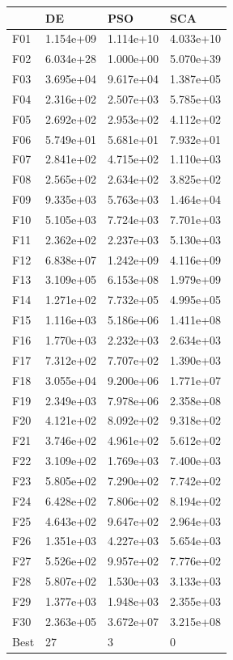 \begin{tabular}{llll}
\toprule
{} &         DE &        PSO &        SCA \\
\midrule
F01  &  1.154e+09 &  1.114e+10 &  4.033e+10 \\
F02  &  6.034e+28 &  1.000e+00 &  5.070e+39 \\
F03  &  3.695e+04 &  9.617e+04 &  1.387e+05 \\
F04  &  2.316e+02 &  2.507e+03 &  5.785e+03 \\
F05  &  2.692e+02 &  2.953e+02 &  4.112e+02 \\
F06  &  5.749e+01 &  5.681e+01 &  7.932e+01 \\
F07  &  2.841e+02 &  4.715e+02 &  1.110e+03 \\
F08  &  2.565e+02 &  2.634e+02 &  3.825e+02 \\
F09  &  9.335e+03 &  5.763e+03 &  1.464e+04 \\
F10  &  5.105e+03 &  7.724e+03 &  7.701e+03 \\
F11  &  2.362e+02 &  2.237e+03 &  5.130e+03 \\
F12  &  6.838e+07 &  1.242e+09 &  4.116e+09 \\
F13  &  3.109e+05 &  6.153e+08 &  1.979e+09 \\
F14  &  1.271e+02 &  7.732e+05 &  4.995e+05 \\
F15  &  1.116e+03 &  5.186e+06 &  1.411e+08 \\
F16  &  1.770e+03 &  2.232e+03 &  2.634e+03 \\
F17  &  7.312e+02 &  7.707e+02 &  1.390e+03 \\
F18  &  3.055e+04 &  9.200e+06 &  1.771e+07 \\
F19  &  2.349e+03 &  7.978e+06 &  2.358e+08 \\
F20  &  4.121e+02 &  8.092e+02 &  9.318e+02 \\
F21  &  3.746e+02 &  4.961e+02 &  5.612e+02 \\
F22  &  3.109e+02 &  1.769e+03 &  7.400e+03 \\
F23  &  5.805e+02 &  7.290e+02 &  7.742e+02 \\
F24  &  6.428e+02 &  7.806e+02 &  8.194e+02 \\
F25  &  4.643e+02 &  9.647e+02 &  2.964e+03 \\
F26  &  1.351e+03 &  4.227e+03 &  5.654e+03 \\
F27  &  5.526e+02 &  9.957e+02 &  7.776e+02 \\
F28  &  5.807e+02 &  1.530e+03 &  3.133e+03 \\
F29  &  1.377e+03 &  1.948e+03 &  2.355e+03 \\
F30  &  2.363e+05 &  3.672e+07 &  3.215e+08 \\
Best &         27 &          3 &          0 \\
\bottomrule
\end{tabular}
